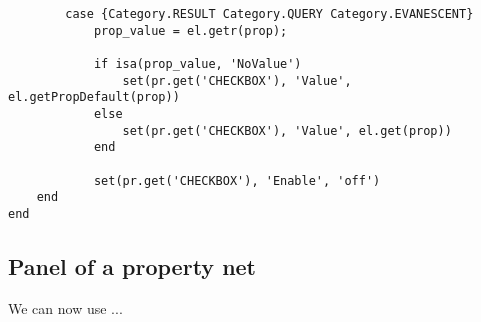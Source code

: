 \documentclass{tufte-handout}
\begin{document}
\begin{lstlisting}
        case {Category.RESULT Category.QUERY Category.EVANESCENT}
            prop_value = el.getr(prop);

            if isa(prop_value, 'NoValue')
                set(pr.get('CHECKBOX'), 'Value', el.getPropDefault(prop))
            else
                set(pr.get('CHECKBOX'), 'Value', el.get(prop))
            end
            
            set(pr.get('CHECKBOX'), 'Enable', 'off')
    end
end

\end{lstlisting}

\clearpage
\subsection{Panel of a property net}

We can now use ...


%
%
\end{document}
